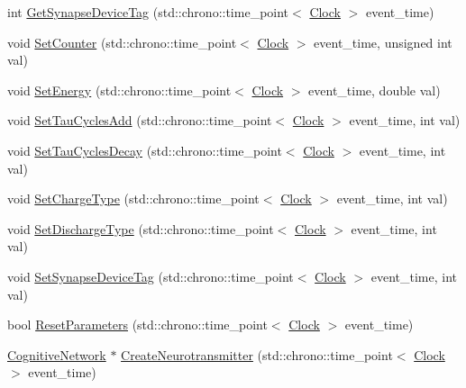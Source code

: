 \begin{DoxyCompactItemize}
int \hyperlink{class_synapse_a4fe6b49e46ebda6f34593d3df54d5593}{Get\+Synapse\+Device\+Tag} (std\+::chrono\+::time\+\_\+point$<$ \hyperlink{universe_8h_a0ef8d951d1ca5ab3cfaf7ab4c7a6fd80}{Clock} $>$ event\+\_\+time)
\item 
void \hyperlink{class_synapse_aa1a990a7b89fbeaf1109a8b70d86111b}{Set\+Counter} (std\+::chrono\+::time\+\_\+point$<$ \hyperlink{universe_8h_a0ef8d951d1ca5ab3cfaf7ab4c7a6fd80}{Clock} $>$ event\+\_\+time, unsigned int val)
\item 
void \hyperlink{class_synapse_aa90b66763c8aca2ad8df535ffed5d4a9}{Set\+Energy} (std\+::chrono\+::time\+\_\+point$<$ \hyperlink{universe_8h_a0ef8d951d1ca5ab3cfaf7ab4c7a6fd80}{Clock} $>$ event\+\_\+time, double val)
\item 
void \hyperlink{class_synapse_afbd7a2e7e6353b3e743ec100fe615e84}{Set\+Tau\+Cycles\+Add} (std\+::chrono\+::time\+\_\+point$<$ \hyperlink{universe_8h_a0ef8d951d1ca5ab3cfaf7ab4c7a6fd80}{Clock} $>$ event\+\_\+time, int val)
\item 
void \hyperlink{class_synapse_a5bbee6bb7dc49c90b7c3413d02e06cc8}{Set\+Tau\+Cycles\+Decay} (std\+::chrono\+::time\+\_\+point$<$ \hyperlink{universe_8h_a0ef8d951d1ca5ab3cfaf7ab4c7a6fd80}{Clock} $>$ event\+\_\+time, int val)
\item 
void \hyperlink{class_synapse_a87fb31c2758d8fc26e8f2cf4fd7d1af5}{Set\+Charge\+Type} (std\+::chrono\+::time\+\_\+point$<$ \hyperlink{universe_8h_a0ef8d951d1ca5ab3cfaf7ab4c7a6fd80}{Clock} $>$ event\+\_\+time, int val)
\item 
void \hyperlink{class_synapse_a1956d553c15fa1aea12d39725baeca1b}{Set\+Discharge\+Type} (std\+::chrono\+::time\+\_\+point$<$ \hyperlink{universe_8h_a0ef8d951d1ca5ab3cfaf7ab4c7a6fd80}{Clock} $>$ event\+\_\+time, int val)
\item 
void \hyperlink{class_synapse_a702c08b1ee4389382a5890d8c19aee9c}{Set\+Synapse\+Device\+Tag} (std\+::chrono\+::time\+\_\+point$<$ \hyperlink{universe_8h_a0ef8d951d1ca5ab3cfaf7ab4c7a6fd80}{Clock} $>$ event\+\_\+time, int val)
\item 
bool \hyperlink{class_synapse_a5b2bbc3553e92492a5c38d1d797fcd92}{Reset\+Parameters} (std\+::chrono\+::time\+\_\+point$<$ \hyperlink{universe_8h_a0ef8d951d1ca5ab3cfaf7ab4c7a6fd80}{Clock} $>$ event\+\_\+time)
\item 
\hyperlink{class_cognitive_network}{Cognitive\+Network} $\ast$ \hyperlink{class_synapse_aef4c17534bc93b31de8e81c1ad138b7b}{Create\+Neurotransmitter} (std\+::chrono\+::time\+\_\+point$<$ \hyperlink{universe_8h_a0ef8d951d1ca5ab3cfaf7ab4c7a6fd80}{Clock} $>$ event\+\_\+time)

\end{DoxyCompactItemize}
